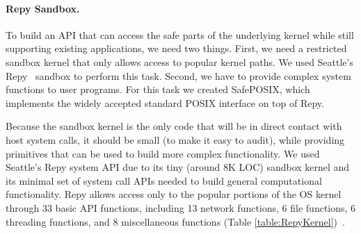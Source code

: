 \paragraph{Repy Sandbox.}

To build an API that can access the safe parts of the underlying kernel while
still supporting existing applications, we need two things. First, we need a
restricted sandbox kernel that only allows access to popular kernel paths. We
used Seattle's Repy~\cite{Repy-10} sandbox to perform this task. Second, we
have to provide complex system functions to user programs.
For this task we created SafePOSIX, which implements the widely accepted standard
POSIX interface on top of Repy.

Because the sandbox kernel is the only code that will be in direct contact with host
system calls, it should be small (to make it easy to audit), while providing
primitives that can be used to build more complex functionality.
We used Seattle's Repy system API due to its tiny (around 8K LOC) sandbox
kernel and its minimal set of system call APIs needed to build general
computational functionality. Repy allows access only to the popular portions of
the OS kernel through 33 basic API functions, including 13 network functions, 6
file functions, 6 threading functions, and 8 miscellaneous functions (Table
\ref{table:RepyKernel})~\cite{Repy-10, RepyKernel}.

